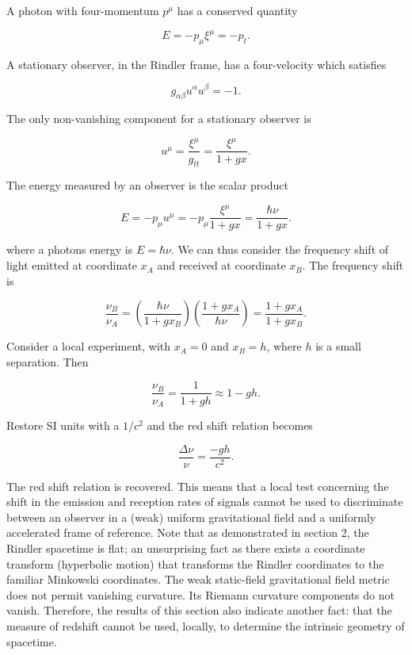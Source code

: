 \documentclass[11pt]{article}
\begin{document}
A photon with four-momentum $p^{\mu}$ has a conserved quantity

\begin{equation}
    E = - p_{\mu} \xi^{\mu} = -p_t.
\end{equation}

A stationary observer, in the Rindler frame, has a four-velocity which satisfies

\begin{equation}
    g_{\alpha \beta} u^{\alpha} u^{\beta} = -1.
\end{equation}

The only non-vanishing component for a stationary observer is

\begin{equation}
    u^{\mu} = \frac{\xi^{\mu}}{g_{tt}} = \frac{\xi^{\mu}}{1 + gx}.
\end{equation}

The energy measured by an observer is the scalar product

\begin{equation}
    E = - p_{\mu} u^{\mu} = - p_{\mu} \frac{\xi^{\mu}}{1 + gx} = \frac{\hbar \nu}{1 + gx}.
\end{equation}

where a photons energy is $E = \hbar \nu$. We can thus consider the frequency shift of light emitted at coordinate $x_A$ and received at coordinate $x_B$. The frequency shift is

\begin{equation}
    \frac{\nu_B}{\nu_A} = \left( \frac{\hbar \nu}{1 + gx_B} \right) \left( \frac{1 + gx_A}{\hbar \nu} \right) = \frac{1 + gx_A}{1 + gx_B}.
\end{equation}

Consider a local experiment, with $x_A = 0$ and $x_B = h$, where $h$ is a small separation. Then

\begin{equation}
    \frac{\nu_B}{\nu_A} = \frac{1}{1 + gh} \approx 1 - gh.
\end{equation}

Restore SI units with a $1/c^2$ and the red shift relation becomes

\begin{equation}
    \label{rindler-red-shift}
    \frac{\Delta \nu}{\nu} = \frac{-gh}{c^2}.
\end{equation}

The red shift relation is recovered. This means that a local test concerning the shift in the emission and reception rates of signals cannot be used to discriminate between an observer in a (weak) uniform gravitational field and a uniformly accelerated frame of reference. Note that as demonstrated in section 2, the Rindler spacetime is flat; an unsurprising fact as there exists a coordinate transform (hyperbolic motion) that transforms the Rindler coordinates to the familiar Minkowski coordinates. The weak static-field gravitational field metric does not permit vanishing curvature. Its Riemann curvature components do not vanish. Therefore, the results of this section also indicate another fact: that the measure of redshift cannot be used, locally, to determine the intrinsic geometry of spacetime.
\end{document}

